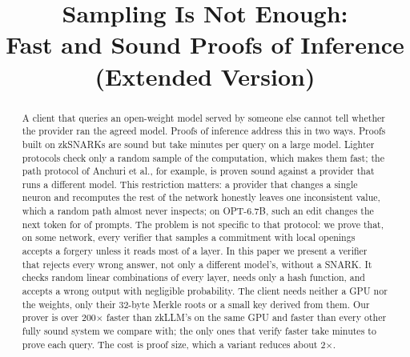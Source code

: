 \documentclass[conference,compsoc]{IEEEtran}
\theoremstyle{plain}
\theoremstyle{definition}
\theoremstyle{remark}
\begin{document}
\title{Sampling Is Not Enough:\\ Fast and Sound Proofs of Inference\ifdefined\pviextended\\ (Extended Version)\fi}

\author{
}

\maketitle

\begin{abstract}
A client that queries an open-weight model served by someone else cannot tell whether the provider ran the agreed model. Proofs of inference address this in two ways. Proofs built on zkSNARKs are sound but take minutes per query on a large model. Lighter protocols check only a random sample of the computation, which makes them fast; the path protocol of Anchuri et al., for example, is proven sound against a provider that runs a different model. This restriction matters: a provider that changes a single neuron and recomputes the rest of the network honestly leaves one inconsistent value, which a random path almost never inspects; on OPT-6.7B, such an edit changes the next token for \AttackOptLSucceeded{} of \AttackOptLPrompts{} prompts. The problem is not specific to that protocol: we prove that, on some network, every verifier that samples a commitment with local openings accepts a forgery unless it reads most of a layer. In this paper we present a verifier that rejects every wrong answer, not only a different model's, without a SNARK. It checks random linear combinations of every layer, needs only a hash function, and accepts a wrong output with negligible probability. The client needs neither a GPU nor the weights, only their 32-byte Merkle roots or a small key derived from them. Our prover is over 200$\times$ faster than zkLLM's on the same GPU and faster than every other fully sound system we compare with; the only ones that verify faster take minutes to prove each query. The cost is proof size, which a variant reduces about 2$\times$.
\end{abstract}











\end{document}

